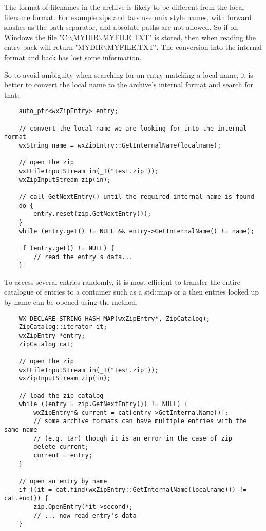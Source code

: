The format of filenames in the archive is likely to be different
from the local filename format. For example zips and tars use
unix style names, with forward slashes as the path separator,
and absolute paths are not allowed. So if on Windows the file
"C:$\backslash$MYDIR$\backslash$MYFILE.TXT" is stored, then when reading
the entry back  will return
"MYDIR$\backslash$MYFILE.TXT". The conversion into the internal format
and back has lost some information.

So to avoid ambiguity when searching for an entry matching a local name,
it is better to convert the local name to the archive's internal format
and search for that:

\begin{verbatim}
    auto_ptr<wxZipEntry> entry;

    // convert the local name we are looking for into the internal format
    wxString name = wxZipEntry::GetInternalName(localname);

    // open the zip
    wxFFileInputStream in(_T("test.zip"));
    wxZipInputStream zip(in);

    // call GetNextEntry() until the required internal name is found
    do {
        entry.reset(zip.GetNextEntry());
    }
    while (entry.get() != NULL && entry->GetInternalName() != name);

    if (entry.get() != NULL) {
        // read the entry's data...
    }

\end{verbatim}

To access several entries randomly, it is most efficient to transfer the
entire catalogue of entries to a container such as a std::map or a
  then entries looked up by name can be
opened using the  method.

\begin{verbatim}
    WX_DECLARE_STRING_HASH_MAP(wxZipEntry*, ZipCatalog);
    ZipCatalog::iterator it;
    wxZipEntry *entry;
    ZipCatalog cat;

    // open the zip
    wxFFileInputStream in(_T("test.zip"));
    wxZipInputStream zip(in);

    // load the zip catalog
    while ((entry = zip.GetNextEntry()) != NULL) {
        wxZipEntry*& current = cat[entry->GetInternalName()];
        // some archive formats can have multiple entries with the same name
        // (e.g. tar) though it is an error in the case of zip
        delete current;
        current = entry;
    }

    // open an entry by name
    if ((it = cat.find(wxZipEntry::GetInternalName(localname))) != cat.end()) {
        zip.OpenEntry(*it->second);
        // ... now read entry's data
    }

\end{verbatim}

